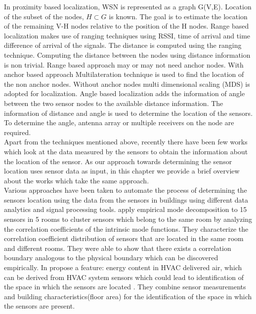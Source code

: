 In proximity based localization, WSN is represented as a graph G(V,E). Location of the  subset of the nodes, $H \subset G$ is known. The goal is to estimate the location of the remaining V-H nodes relative to the position of the H nodes. 
Range based localization makes use of  ranging techniques using RSSI, time of arrival and time difference of arrival of the signals. The distance is computed using the ranging technique. Computing the distance between the nodes using distance information is non trivial. Range based approach may or may not need anchor nodes. With anchor based approach Multilateration technique is used to find the location of the non anchor nodes. Without anchor nodes multi dimensional scaling (MDS) is adopted for localization. 
Angle based  localization adds the information of angle between the two sensor nodes to the available distance information. The information of distance and angle is used to determine the location of the sensors. To determine the angle, antenna array or multiple receivers on the node are required.\\
Apart from the techniques mentioned above, recently there have been few works which look at the data measured by the sensors to obtain the information about the location of the sensor. As our approach towards determining the sensor location uses sensor data as input, in this chapter we provide a brief overview about the works which take the same approach. \\
Various approaches have been taken to automate the process of determining the sensors location using the data from the sensors in buildings using different data analytics and signal processing tools. \citeauthor{Hong:2013:TAS:2528282.2528302}\cite{Hong:2013:TAS:2528282.2528302}
 apply empirical mode decomposition to 15 sensors in 5 rooms to cluster sensors which belong to the same room by analyzing the correlation coefficients of the intrinsic mode functions. They characterize the correlation coefficient distribution of sensors that are located in the
 same room and different rooms. They were able to show that there exists a correlation boundary analogous to the physical boundary which can be discovered empirically. 
In \cite{doi:10.1061/9780784413616.226} \citeauthor{doi:10.1061/9780784413616.226} propose a feature: energy content in HVAC delivered air, which can be derived from HVAC system sensors which could lead to identification of the space in which the sensors are located . They combine sensor measurements and building characteristics(floor area) for the identification of the space in which the sensors are present.
